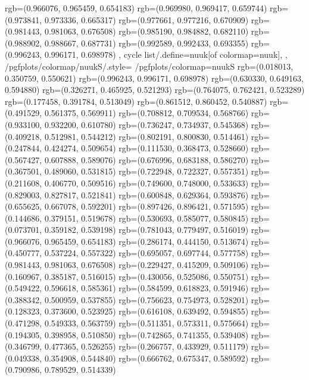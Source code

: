 {{{					rgb=(0.966076, 0.965459, 0.654183)
					rgb=(0.969980, 0.969417, 0.659744)
					rgb=(0.973841, 0.973336, 0.665317)
					rgb=(0.977661, 0.977216, 0.670909)
					rgb=(0.981443, 0.981063, 0.676508)
					rgb=(0.985190, 0.984882, 0.682110)
					rgb=(0.988902, 0.988667, 0.687731)
					rgb=(0.992589, 0.992433, 0.693355)
					rgb=(0.996243, 0.996171, 0.698978)
			},
		cycle list/.define={nuuk}{[of colormap=nuuk]},
		},
		/pgfplots/colormap/nuukS/.style={
			/pgfplots/colormap={nuukS}{%
					rgb=(0.018013, 0.350759, 0.550621)
					rgb=(0.996243, 0.996171, 0.698978)
					rgb=(0.630330, 0.649163, 0.594880)
					rgb=(0.326271, 0.465925, 0.521293)
					rgb=(0.764075, 0.762421, 0.523289)
					rgb=(0.177458, 0.391784, 0.513049)
					rgb=(0.861512, 0.860452, 0.540887)
					rgb=(0.491529, 0.561375, 0.569911)
					rgb=(0.708812, 0.709534, 0.568766)
					rgb=(0.933100, 0.932200, 0.610780)
					rgb=(0.736247, 0.734937, 0.545368)
					rgb=(0.409218, 0.512981, 0.544212)
					rgb=(0.802191, 0.800830, 0.514461)
					rgb=(0.247844, 0.424274, 0.509654)
					rgb=(0.111530, 0.368473, 0.528660)
					rgb=(0.567427, 0.607888, 0.589076)
					rgb=(0.676996, 0.683188, 0.586270)
					rgb=(0.367501, 0.489060, 0.531815)
					rgb=(0.722948, 0.722327, 0.557351)
					rgb=(0.211608, 0.406770, 0.509516)
					rgb=(0.749600, 0.748000, 0.533633)
					rgb=(0.829003, 0.827817, 0.521841)
					rgb=(0.600848, 0.629364, 0.593876)
					rgb=(0.655625, 0.667078, 0.592201)
					rgb=(0.897426, 0.896421, 0.571595)
					rgb=(0.144686, 0.379151, 0.519678)
					rgb=(0.530693, 0.585077, 0.580845)
					rgb=(0.073701, 0.359182, 0.539198)
					rgb=(0.781043, 0.779497, 0.516019)
					rgb=(0.966076, 0.965459, 0.654183)
					rgb=(0.286174, 0.444150, 0.513674)
					rgb=(0.450777, 0.537224, 0.557322)
					rgb=(0.695057, 0.697744, 0.577758)
					rgb=(0.981443, 0.981063, 0.676508)
					rgb=(0.229427, 0.415209, 0.509106)
					rgb=(0.160967, 0.385187, 0.516015)
					rgb=(0.430056, 0.525086, 0.550751)
					rgb=(0.549422, 0.596618, 0.585361)
					rgb=(0.584599, 0.618823, 0.591946)
					rgb=(0.388342, 0.500959, 0.537855)
					rgb=(0.756623, 0.754973, 0.528201)
					rgb=(0.128323, 0.373600, 0.523925)
					rgb=(0.616108, 0.639492, 0.594855)
					rgb=(0.471298, 0.549333, 0.563759)
					rgb=(0.511351, 0.573311, 0.575664)
					rgb=(0.194305, 0.398958, 0.510850)
					rgb=(0.742865, 0.741355, 0.539408)
					rgb=(0.346799, 0.477365, 0.526255)
					rgb=(0.266757, 0.433929, 0.511179)
					rgb=(0.049338, 0.354908, 0.544840)
					rgb=(0.666762, 0.675347, 0.589592)
					rgb=(0.790986, 0.789529, 0.514339)
}}}
